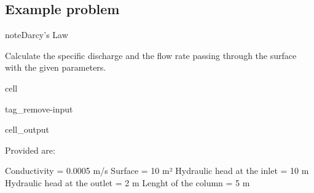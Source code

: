 \documentclass[letterpaper,10pt,english]{jupyterBook}
\begin{document}
\subsection{Example problem}
\label{\detokenize{content/flow/L4/14_darcy_law_K:id1}}
\begin{sphinxadmonition}{note}{Darcy’s Law}

\sphinxAtStartPar
Calculate the specific discharge and the flow rate passing through the surface with the given parameters.
\end{sphinxadmonition}

\begin{sphinxuseclass}{cell}
\begin{sphinxuseclass}{tag_remove-input}\begin{sphinxVerbatimOutput}

\begin{sphinxuseclass}{cell_output}
\begin{sphinxVerbatim}[commandchars=\\\{\}]
Provided are:

Conductivity = 0.0005 m/s
Surface = 10 m²
Hydraulic head at the inlet = 10 m
Hydraulic head at the outlet = 2 m
Lenght of the column = 5 m 
\end{sphinxVerbatim}

\end{sphinxuseclass}\end{sphinxVerbatimOutput}

\end{sphinxuseclass}
\end{sphinxuseclass}
\end{document}
